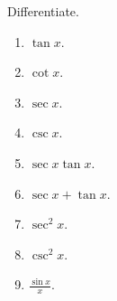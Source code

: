 Differentiate.

\begin{multicols}{2}
\begin{enumerate}
\item $\tan x$.
\item $\cot x$.
\item $\sec x$.
\item $\csc x$.
\item $\sec x\tan x$.
\item $\sec x+\tan x$.
\item $\sec^2 x$.
\item $\csc^2 x$.
\item $\frac{\sin x}{x}$.
\end{enumerate}

\end{multicols}